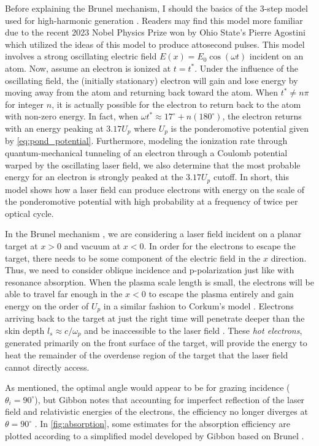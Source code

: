 Before explaining the Brunel mechanism, I should the basics of the 3-step model used for high-harmonic generation \cite{Corkum_1993_PRL}. Readers may find this model more familiar due to the recent 2023 Nobel Physics Prize won by Ohio State's Pierre Agostini \cite{Nobel_2023} which utilized the ideas of this model to produce attosecond pulses. This model involves a strong oscillating electric field $E(x) = E_0 \cos(\omega t)$ incident on an atom. Now, assume an electron is ionized at $t = t^*$. Under the influence of the oscillating field, the (initially stationary) electron will gain  and lose energy by moving away from the atom and returning back toward the atom. When $t^* \neq n \pi$ for integer $n$, it is actually possible for the electron to return back to the atom with non-zero energy. In fact, when $\omega t^* \approx 17^\circ + n (180^\circ)$, the electron returns with an energy peaking at $3.17 U_p$ where $U_p$ is the ponderomotive potential given by \cref{eq:pond_potential}. Furthermore, modeling the ionization rate through quantum-mechanical tunneling of an electron through a Coulomb potential warped by the oscillating laser field, we also determine that the most probable energy for an electron is strongly peaked at the $3.17 U_p$ cutoff. In short, this model shows how a laser field can produce electrons with energy on the scale of the ponderomotive potential with high probability at a frequency of twice per optical cycle. 

In the Brunel mechanism \cite{Brunel_1987_PRL}, we are considering a laser field incident on a planar target at $x > 0$ and vacuum at $x < 0$. In order for the electrons to escape the target, there needs to be some component of the electric field in the $x$ direction. Thus, we need to consider oblique incidence and p-polarization just like with resonance absorption. When the plasma scale length is small, the electrons will be able to travel far enough in the $x < 0$ to escape the plasma entirely and gain energy on the order of $U_p$ in a similar fashion to Corkum's model \cite{Corkum_1993_PRL}. Electrons arriving back to the target at just the right time will penetrate deeper than the skin depth $l_s \approx c / \omega_p$ and be inaccessible to the laser field \cite{Gibbon_2005_Plasma}. These \emph{hot electrons}, generated primarily on the front surface of the target, will provide the energy to heat the remainder of the overdense region of the target that the laser field cannot directly access. 

As mentioned, the optimal angle would appear to be for grazing incidence ($\theta_i = 90^\circ$), but Gibbon notes that accounting for imperfect reflection of the laser field and relativistic energies of the electrons, the efficiency no longer diverges at $\theta = 90^\circ$ \cite{Gibbon_2005_Plasma}. In \cref{fig:absorption}, some estimates for the absorption efficiency are plotted according to a simplified model developed by Gibbon \cite{Gibbon_2005_Plasma} based on Brunel \cite{Brunel_1987_PRL}.

